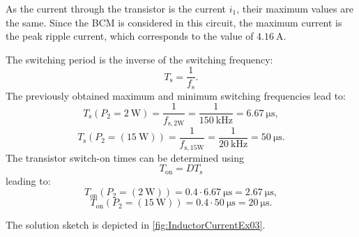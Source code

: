  \begin{solutionblock}
    As the current through the transistor is the current $i_1$, their maximum values are the same. Since the BCM is considered in this circuit, the maximum current is the peak ripple current, which corresponds to the value of $\SI{4.16}{\ampere}$.
 \end{solutionblock}

 \begin{solutionblock}
 The switching period is the inverse of the switching frequency: 
 \begin{equation}
    T_\mathrm{s} = \frac{1}{f_\mathrm{s}}. \label{switching frequency}
 \end{equation}
 The previously obtained maximum and minimum switching frequencies lead to:
 \begin{equation}
    T_\mathrm{s}(P_\mathrm{2}=\SI{2}{\watt}) =\frac{1}{f_{\mathrm{s,2W}}} = \frac{1}{\SI{150}{\kilo \hertz}}= \SI{6.67}{\micro \s},
 \end{equation}
 \begin{equation}
    T_\mathrm{s}(P_\mathrm{2}=(\SI{15}{\watt})) =\frac{1}{f_{\mathrm{s,15W}}} = \frac{1}{\SI{20}{\kilo \hertz}}= \SI{50}{\micro \s}.
 \end{equation}
 The transistor switch-on times can be determined using 
 \begin{equation}
    T_\mathrm{on} = D T_\mathrm{s} \label{absolut value switch-on-times}
 \end{equation}
 leading to:
 \begin{equation}
    T_\mathrm{on}(P_\mathrm{2}=(\SI{2}{\watt})) = 0.4 \cdot \SI{6.67}{\micro \s} = \SI{2.67}{\micro \s},
 \end{equation}
 \begin{equation}
    T_\mathrm{on}(P_\mathrm{2}=(\SI{15}{\watt})) = 0.4 \cdot \SI{50}{\micro \s}= \SI{20}{\micro \s}.
 \end{equation}
 \end{solutionblock}

\begin{solutionblock}
    The solution sketch is depicted in \autoref{fig:InductorCurrentEx03}.
       
\end{solutionblock}
    
